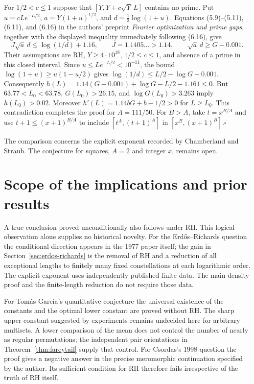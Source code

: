 \documentclass[11pt,a4paper]{article}
\begin{document}
For $1/2<c\le1$ suppose that $[Y,Y+c\sqrt Y\,L]$ contains no prime.
Put $u=cLe^{-L/2}$, $a=Y(1+u)^{1/2}$, and $d=\tfrac12\log(1+u)$.
Equations (5.9)--(5.11), (6.11), and (6.16) in the authors' preprint \cite{cms}
\emph{Fourier optimization and prime gaps}, together with the displayed
inequality immediately following (6.16), give
\[
 J\sqrt a\,d\le \log(1/d)+1.16,\qquad J=1.1405\ldots>1.14,
 \qquad \sqrt a\,d\ge G-0.001.
\]
Their assumptions are RH, $Y\ge4\cdot10^{18}$, $1/2\le c\le1$,
and absence of a prime in this closed interval. Since
$u\le Le^{-L/2}<10^{-11}$, the bound
$\log(1+u)\ge u(1-u/2)$ gives $\log(1/d)\le L/2-\log G+0.001$.
Consequently $h(L)=1.14(G-0.001)+\log G-L/2-1.161\le0$.
But $63.77<L_0<63.78$, $G(L_0)>26.15$, and $\log G(L_0)>3.263$ imply
$h(L_0)>0.02$. Moreover $h'(L)=1.14bG+b-1/2>0$ for $L\ge L_0$.
This contradiction completes the proof for $A=111/50$.
For $B>A$, take $t=x^{B/A}$ and use $t+1\le(x+1)^{B/A}$ to include
$[t^A,(t+1)^A]$ in $[x^B,(x+1)^B]$.\hfill$\square$

The comparison concerns the explicit exponent recorded by Chamberland and
Straub. The conjecture for squares, $A=2$ and integer $x$, remains open.

\section{Scope of the implications and prior results}
A true conclusion proved unconditionally also follows under RH. This
logical observation alone supplies no historical novelty. For the
Erd\H{o}s--Richards question the conditional direction appears in the
1977 paper itself; the gain in Section~\ref{sec:erdos-richards} is the
removal of RH and a reduction of all exceptional lengths to finitely
many fixed constellations at each logarithmic order. The explicit
exponent uses independently published finite data. The main density
proof and the finite-length reduction do not require those data.

For Tom\'as Garc\'ia's quantitative conjecture the universal existence
of the constants and the optimal lower constant are proved without RH.
The sharp upper constant suggested by experiments remains undecided
here for arbitrary multisets. A lower comparison of the mean does not
control the number of nearly as regular permutations; the independent
pair orientations in Theorem~\ref{thm:fareytail} supply that control.
For Csordas's 1998 question the proof gives a negative answer in the
precise meromorphic continuation specified by the author. Its
sufficient condition for RH therefore fails irrespective of the
truth of RH itself.
\end{document}
